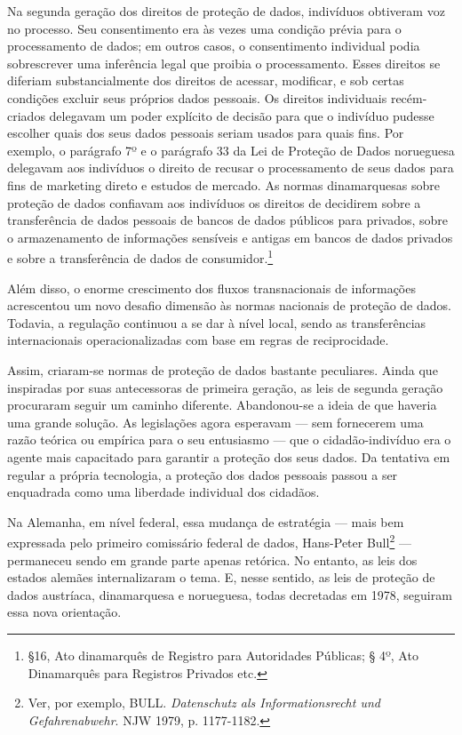 Na segunda geração dos direitos de proteção de dados, indivíduos
obtiveram voz no processo. Seu consentimento era às vezes uma condição
prévia para o processamento de dados; em outros casos, o consentimento
individual podia sobrescrever uma inferência legal que proibia o
processamento. Esses direitos se diferiam substancialmente dos direitos
de acessar, modificar, e sob certas condições excluir seus próprios
dados pessoais. Os direitos individuais recém-criados delegavam um poder
explícito de decisão para que o indivíduo pudesse escolher quais dos
seus dados pessoais seriam usados para quais fins. Por exemplo, o
parágrafo 7º e o parágrafo 33 da Lei de Proteção de Dados norueguesa
delegavam aos indivíduos o direito de recusar o processamento de seus
dados para fins de marketing direto e estudos de mercado. As normas
dinamarquesas sobre proteção de dados confiavam aos indivíduos os
direitos de decidirem sobre a transferência de dados pessoais de bancos
de dados públicos para privados, sobre o armazenamento de informações
sensíveis e antigas em bancos de dados privados e sobre a transferência
de dados de consumidor.\footnote{§16, Ato dinamarquês de Registro para
  Autoridades Públicas; § 4º, Ato Dinamarquês para Registros Privados
  etc.}

Além disso, o enorme crescimento dos fluxos transnacionais de
informações acrescentou um novo desafio dimensão às normas nacionais de
proteção de dados. Todavia, a regulação continuou a se dar à nível
local, sendo as transferências internacionais operacionalizadas com base
em regras de reciprocidade.

Assim, criaram-se normas de proteção de dados bastante peculiares. Ainda
que inspiradas por suas antecessoras de primeira geração, as leis de
segunda geração procuraram seguir um caminho diferente. Abandonou-se a
ideia de que haveria uma grande solução. As legislações agora esperavam
--- sem fornecerem uma razão teórica ou empírica para o seu entusiasmo
--- que o cidadão-indivíduo era o agente mais capacitado para garantir a
proteção dos seus dados. Da tentativa em regular a própria tecnologia, a
proteção dos dados pessoais passou a ser enquadrada como uma liberdade
individual dos cidadãos.

Na Alemanha, em nível federal, essa mudança de estratégia --- mais bem
expressada pelo primeiro comissário federal de dados, Hans-Peter
Bull\footnote{Ver, por exemplo, BULL. \emph{Datenschutz als
  Informationsrecht und Gefahrenabwehr}. NJW 1979, p. 1177-1182.} ---
permaneceu sendo em grande parte apenas retórica. No entanto, as leis
dos estados alemães internalizaram o tema. E, nesse sentido, as leis de
proteção de dados austríaca, dinamarquesa e norueguesa, todas decretadas
em 1978, seguiram essa nova orientação.

